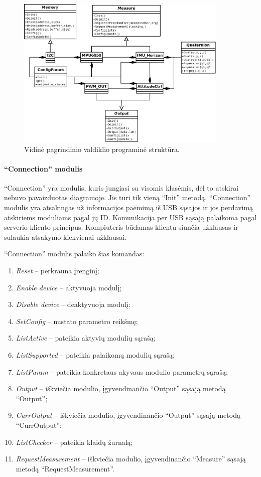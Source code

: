 \documentclass[12pt, a4paper, lithuanian, final]{article}
\begin{document}
\begin{figure}[H]
\begin{center}
\includegraphics[width=0.9\textwidth]{img/classDiagram.png}
\caption{Vidinė pagrindinio valdiklio programinė struktūra.}
\end{center}
\end{figure}


\paragraph{"`Connection"' modulis}
"`Connection"' yra modulis, kuris jungiasi su visomis klasėmis, dėl to atskirai nebuvo pavaizduotas diagramoje.
Jis turi tik vieną "`Init"' metodą.
"`Connection"' modulis yra atsakingas už informacijos paėmimą iš USB sąsajos ir jos perdavimą atskiriems moduliams pagal jų ID.
Komunikacija per USB sąsają palaikoma pagal serverio-kliento principus.
Kompiuteris būdamas klientu siunčia užklausas ir sulaukia atsakymo kiekvienai užklausai.

"`Connection"' modulis palaiko šias komandas:
\begin{enumerate}
	\item \textit{Reset} -- perkrauna įrenginį;
	\item \textit{Enable device} -- aktyvuoja modulį;
	\item \textit{Disable device} -- deaktyvuoja modulį;
	\item \textit{SetConfig} -- nustato parametro reikšmę;
	\item \textit{ListActive} -- pateikia aktyvių modulių sąrašą;
	\item \textit{ListSupported} -- pateikia palaikomų modulių sąrašą;
	\item \textit{ListParam} -- pateikia konkretaus akyvaus modulio parametrų sąrašą;
	\item \textit{Output} -- iškviečia modulio, įgyvendinančio "`Output"' sąsają metodą "`Output"';
	\item \textit{CurrOutput} -- iškviečia modulio, įgyvendinančio "`Output"' sąsają metodą "`CurrOutput"';
	\item \textit{ListChecker} -- pateikia klaidų žurnalą;
	\item \textit{RequestMeasurement} -- iškviečia modulio, įgyvendinančio "`Measure"' sąsają metodą "`RequestMeasurement"'.
\end{enumerate}
\end{document}
